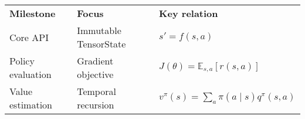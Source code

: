 \begin{tabular}{lll}
\textbf{Milestone} & \textbf{Focus} & \textbf{Key relation} \\
Core API & Immutable TensorState & $s' = f(s, a)$ \\
Policy evaluation & Gradient objective & $J(\theta) = \mathbb{E}_{s,a}[r(s,a)]$ \\
Value estimation & Temporal recursion & $v^{\pi}(s) = \sum_a \pi(a \mid s) q^{\pi}(s,a)$ \\
\end{tabular}
